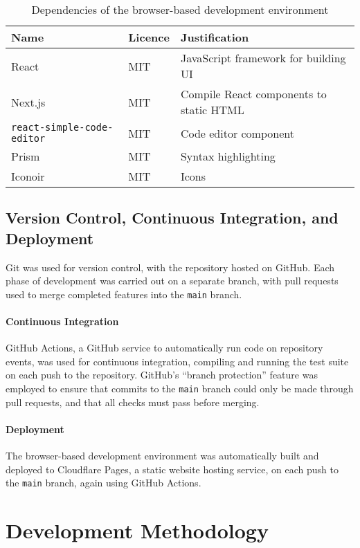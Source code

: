 \begin{table}[H]
\centering
\begin{tabular}{lll}
\hline
\textbf{Name} & \textbf{Licence} & \textbf{Justification} \\
\hline
React & MIT & JavaScript framework for building UI \\
Next.js & MIT & Compile React components to static HTML \\
\texttt{react-simple-code-editor} & MIT & Code editor component \\
Prism & MIT & Syntax highlighting \\
Iconoir & MIT & Icons \\
\hline
\end{tabular}
\caption{Dependencies of the browser-based development environment}
\label{tab:web-dependencies}
\end{table}

\subsection{Version Control, Continuous Integration, and Deployment}

\label{sec:vc-ci-cd}

Git was used for version control, with the repository hosted on GitHub. Each phase of development was carried out on a separate branch, with pull requests used to merge completed features into the \texttt{main} branch.

\paragraph{Continuous Integration} GitHub Actions, a GitHub service to automatically run code on repository events, was used for continuous integration, compiling and running the test suite on each push to the repository. GitHub's ``branch protection'' feature was employed to ensure that commits to the \texttt{main} branch could only be made through pull requests, and that all checks must pass before merging.

\paragraph{Deployment} The browser-based development environment was automatically built and deployed to Cloudflare Pages, a static website hosting service, on each push to the \texttt{main} branch, again using GitHub Actions.

\section{Development Methodology}

